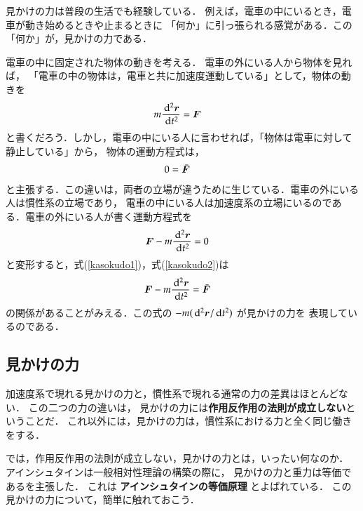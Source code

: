                 見かけの力は普段の生活でも経験している．
                例えば，電車の中にいるとき，電車が動き始めるときや止まるときに
                「何か」に引っ張られる感覚がある．この「何か」が，見かけの力である．

                電車の中に固定された物体の動きを考える．
                電車の外にいる人から物体を見れば，
                「電車の中の物体は，電車と共に加速度運動している」として，物体の動きを
                    \begin{align}\label{kasokudo1}
                        m\frac{\df^{2}\br}{\df t^{2}}
                        &= \bF
                    \end{align}
                と書くだろう．しかし，電車の中にいる人に言わせれば，「物体は電車に対して静止している」から，
                物体の運動方程式は，
                    \begin{align}\label{kasokudo2}
                        0 &= \bar{\bF}
                    \end{align}
                と主張する．この違いは，両者の立場が違うために生じている．電車の外にいる人は慣性系の立場であり，
                電車の中にいる人は加速度系の立場にいるのである．電車の外にいる人が書く運動方程式を
                    \begin{align}
                        \boldsymbol{F}-m\frac{\,\mathrm{d}^{2}\boldsymbol{r}}{\,\mathrm{d} t^{2}} &= 0
                    \end{align}
                と変形すると，式(\ref{kasokudo1})，式(\ref{kasokudo2})は
                    \begin{align}
                        \boldsymbol{F}-m\frac{\,\mathrm{d}^{2}\boldsymbol{r}}{\,\mathrm{d} t^{2}} &= \bar{\boldsymbol{F}}
                    \end{align}
                の関係があることがみえる．この式の $-m(\,\mathrm{d}^{2}\boldsymbol{r}/\,\mathrm{d} t^{2})$ が見かけの力を
                表現しているのである．

\subsection{見かけの力}
                加速度系で現れる見かけの力と，慣性系で現れる通常の力の差異はほとんどない．
                この二つの力の違いは，
                見かけの力には\textbf{作用反作用の法則が成立しない}ということだ．
                これ以外には，見かけの力は，慣性系における力と全く同じ働きをする．

                では，作用反作用の法則が成立しない，見かけの力とは，いったい何なのか．
                アインシュタインは一般相対性理論の構築の際に，
                見かけの力と重力は等価であるを主張した．
                これは \textbf{アインシュタインの等価原理} とよばれている．
                この見かけの力について，簡単に触れておこう．

